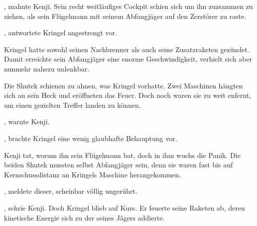 , mahnte Kenji. Sein recht weitläufiges Cockpit schien sich um ihn zuzsammen zu ziehen, als sein Flügelmann mit seinem Abfangjäger auf den Zerstörer  zu raste.

\par


\par

, antwortete Kringel angestrengt vor. 

\par

Kringel hatte sowohl seinen Nachbrenner als auch seine Zusatzraketen gezündet. Damit erreichte sein Abfangjäger eine enorme Geschwindigkeit, verhielt sich aber nunmehr nahezu unlenkbar.

\par

Die Shutek schienen zu ahnen, was Kringel vorhatte. Zwei Maschinen hängten sich an sein Heck und eröffneten das Feuer. Doch noch waren sie zu weit enfernt, um einen gezielten Treffer landen zu können.

\par

, warnte Kenji. 

\par

, brachte Kringel eine wenig glaubhafte Behauptung vor. 

\par

Kenji tat, worum ihn sein Flügelmann bat, doch in ihm wuchs die Panik. Die beiden Shutek mussten selbst Abfangjäger sein, denn sie waren fast bis auf Kernschussdistanz an Kringels Maschine herangekommen.

\par

, meldete dieser, scheinbar völlig ungerührt. 

\par

, schrie Kenji. Doch Kringel blieb auf Kurs. Er feuerte seine Raketen ab, deren kinetische Energie sich zu der seines Jägers addierte.

